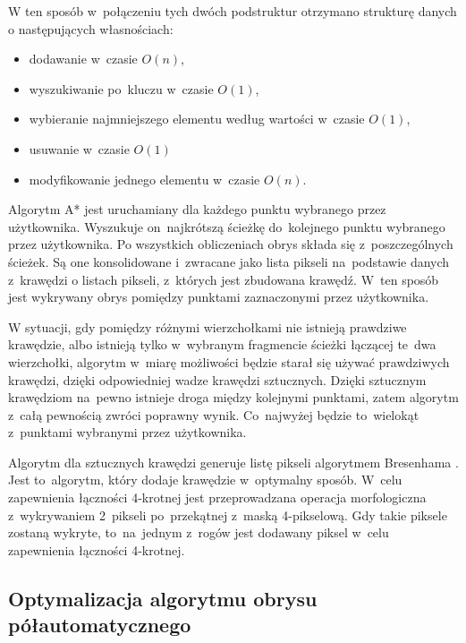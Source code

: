\documentclass[a4paper,11pt,twoside,openright]{report}
\theoremstyle{definition}
\begin{document}
W ten sposób w~połączeniu tych dwóch podstruktur otrzymano strukturę danych
o następujących własnościach:
\begin{itemize}[noitemsep]
\item dodawanie w~czasie $O(n)$,
\item wyszukiwanie po~kluczu w~czasie $O(1)$,
\item wybieranie najmniejszego elementu według wartości w~czasie $O(1)$,
\item usuwanie w~czasie $O(1)$
\item modyfikowanie jednego elementu w~czasie $O(n)$.
\end{itemize}

Algorytm A* jest uruchamiany dla każdego punktu wybranego przez użytkownika.
Wyszukuje on~najkrótszą ścieżkę do~kolejnego punktu wybranego przez użytkownika.
Po wszystkich obliczeniach obrys składa się z~poszczególnych ścieżek. Są one
konsolidowane i~zwracane jako lista pikseli na~podstawie danych z~krawędzi o
listach pikseli, z~których jest zbudowana krawędź. W~ten sposób jest wykrywany
obrys pomiędzy punktami zaznaczonymi przez użytkownika.

W sytuacji, gdy pomiędzy różnymi wierzchołkami nie istnieją prawdziwe krawędzie,
albo istnieją tylko w~wybranym fragmencie ścieżki łączącej te~dwa wierzchołki,
algorytm w~miarę możliwości będzie starał się używać prawdziwych krawędzi, dzięki
odpowiedniej wadze krawędzi sztucznych. Dzięki sztucznym krawędziom na~pewno
istnieje droga między kolejnymi punktami, zatem algorytm z~całą pewnością zwróci
poprawny wynik. Co~najwyżej będzie to~wielokąt z~punktami wybranymi przez użytkownika.

Algorytm dla sztucznych krawędzi generuje listę pikseli algorytmem Bresenhama
\cite{Bresenham}. Jest to~algorytm, który dodaje krawędzie w~optymalny sposób.
W~celu zapewnienia łączności 4-krotnej jest przeprowadzana operacja
morfologiczna z~wykrywaniem 2~pikseli po~przekątnej z~maską 4-pikselową. Gdy takie
piksele zostaną wykryte, to~na~jednym z~rogów jest dodawany piksel w~celu
zapewnienia łączności 4-krotnej.

\subsection {Optymalizacja algorytmu obrysu półautomatycznego}
\end{document}
